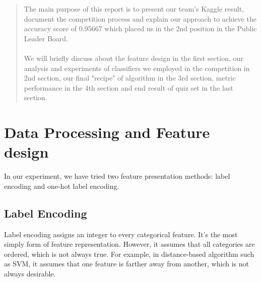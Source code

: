 \documentclass[conference]{IEEEtran}
\begin{document}




\maketitle

\begin{abstract}
The main purpose of this report is to present our team's Kaggle result, document the competition process and explain our approach to achieve the accuracy score of 0.95667 which placed us in the 2nd position in the Public Leader Board.
\\ \\
We will briefly discuss about the feature design in the first section, our analysis and experiments of classifiers we employed in the competition in 2nd section, our final "recipe" of algorithm in the 3rd section, metric performance in the 4th section and end result of quiz set in the last section.
\end{abstract}

\bigskip
%
\IEEEpeerreviewmaketitle

\section{Data Processing and Feature design}
In our experiment, we have tried two feature presentation methods: label encoding and one-hot label encoding.

\subsection{Label Encoding}
Label encoding assigns an integer to every categorical feature. It's the most simply form of feature representation. However, it assumes that all categories are ordered, which is not always true. For example, in distance-based algorithm such as SVM, it assumes that one feature is farther away from another, which is not always desirable. 
\end{document}
